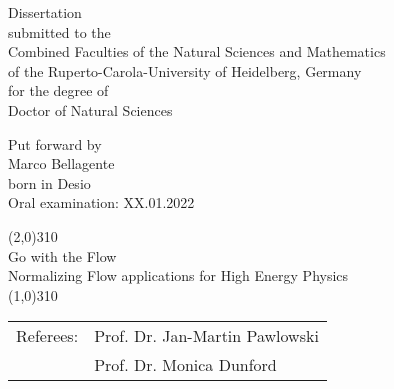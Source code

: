\thispagestyle{empty}
\mbox{}
\vspace*{5mm}
\begin{center}
\sffamily
\large
Dissertation\\[1.5mm]
submitted to the\\[1.5mm] 
Combined Faculties of the Natural Sciences and Mathematics\\[1.5mm]
of the Ruperto-Carola-University of Heidelberg, Germany \\[1.5mm]
for the degree of \\[1.5mm]
Doctor of Natural Sciences


\vfill
{
\normalsize
Put forward by\\[1.5mm]
Marco Bellagente\\
born in Desio\\
Oral examination: XX.01.2022
}
\end{center}
\clearpage{\pagestyle{empty}\cleardoublepage}

\newpage
\thispagestyle{empty}
\mbox{}
\vspace*{3cm}
\sffamily
\begin{center}
\line(2,0){310}\\[3mm]
\Huge{Go with the Flow}\\[2mm]
\Large{Normalizing Flow applications for High Energy Physics}\\[3mm]
\line(1,0){310}
\end{center}


\vfill
\begin{tabular}{ll}
Referees: &  Prof. Dr. Jan-Martin Pawlowski\\[2mm]
               &  Prof. Dr. Monica Dunford \\
\end{tabular}

\rmfamily

\newpage